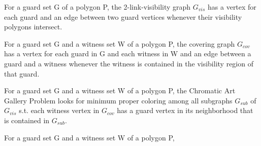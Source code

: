 \begin{definition}
For a guard set G of a polygon P, the 2-link-visibility graph $G_{vis}$ has a vertex for each guard and an edge between two guard vertices whenever their visibility polygons intersect.
\end{definition}

\begin{definition}
For a guard set G and a witness set W of a polygon P, the covering graph $G_{cov}$ has a vertex for each guard in G and each witness in W and an edge between a guard and a witness whenever the witness is contained in the visibility region of that guard.
\end{definition}

\begin{definition}
For a guard set G and a witness set W of a polygon P, the Chromatic Art Gallery Problem looks for minimum proper coloring among all subgraphs $G_{sub}$ of $G_{vis}$ s.t. each witness vertex in $G_{cov}$ has a guard vertex in its neighborhood that is contained in $G_{sub}$.
\end{definition}

\begin{definition}
For a guard set G and a witness set W of a polygon P, 
\end{definition}